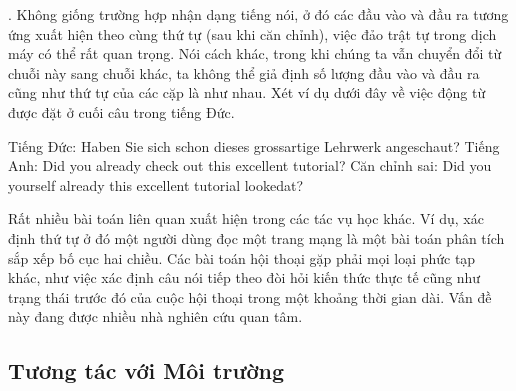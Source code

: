 \documentclass[letterpaper,11pt,english]{sphinxmanual}
\begin{document}
. Không giống trường hợp nhận dạng tiếng nói, ở đó các đầu
vào và đầu ra tương ứng xuất hiện theo cùng thứ tự (sau khi căn chỉnh),
việc đảo trật tự trong dịch máy có thể rất quan trọng. Nói cách khác,
trong khi chúng ta vẫn chuyển đổi từ chuỗi này sang chuỗi khác, ta không
thể giả định số lượng đầu vào và đầu ra cũng như thứ tự của các cặp là
như nhau. Xét ví dụ dưới đây về việc động từ được đặt ở cuối câu trong
tiếng Đức.

\begin{sphinxVerbatim}[commandchars=\\\{\}]
Tiếng Đức:           Haben Sie sich schon dieses grossartige Lehrwerk angeschaut?
Tiếng Anh:          Did you already check out this excellent tutorial?
Căn chỉnh sai:  Did you yourself already this excellent tutorial looked\PYGZhy{}at?
\end{sphinxVerbatim}



Rất nhiều bài toán liên quan xuất hiện trong các tác vụ học khác. Ví dụ,
xác định thứ tự ở đó một người dùng đọc một trang mạng là một bài toán
phân tích sắp xếp bố cục hai chiều. Các bài toán hội thoại gặp phải mọi
loại phức tạp khác, như việc xác định câu nói tiếp theo đòi hỏi kiến
thức thực tế cũng như trạng thái trước đó của cuộc hội thoại trong một
khoảng thời gian dài. Vấn đề này đang được nhiều nhà nghiên cứu quan
tâm.








\subsection{}
\label{\detokenize{chapter_introduction/index_vn:dich-tieu-de-phia-tren}}
















\subsection{Tương tác với Môi trường}
\label{\detokenize{chapter_introduction/index_vn:tuong-tac-voi-moi-truong}}
\end{document}
